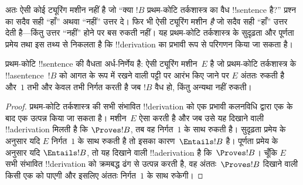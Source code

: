 \documentclass[../../../include/open-logic-section]{subfiles}
\begin{document}
\begin{explain}
अतः ऐसी कोई ट्यूरिंग मशीन नहीं है जो ``क्या $!B$ प्रथम-कोटि तर्कशास्त्र
का वैध !!{sentence} है?'' प्रश्न का सदैव सही ``हाँ'' अथवा ``नहीं'' उत्तर
दे। फिर भी ऐसी ट्यूरिंग मशीन \emph{है} जो सदैव सही ``हाँ'' उत्तर देती
है---किंतु उत्तर ``नहीं'' होने पर बस रुकती नहीं। यह प्रथम-कोटि
तर्कशास्त्र के सुदृढ़ता और पूर्णता प्रमेय तथा इस तथ्य से निकलता है कि
!!{derivation} का प्रभावी रूप से परिगणन किया जा सकता है।
\end{explain}

\begin{thm}
  प्रथम-कोटि !!{sentence} की वैधता अर्ध-निर्णेय है: ऐसी ट्यूरिंग
  मशीन~$E$ है जो प्रथम-कोटि तर्कशास्त्र के !!a{sentence}~$!B$ को आगत के
  रूप में रखने वाली पट्टी पर आरंभ किए जाने पर $E$ अंततः रुकती है और~$1$
  तभी और केवल तभी निर्गत करती है जब $!B$ वैध हो, किंतु अन्यथा नहीं रुकती।
\end{thm}

\begin{proof}
  प्रथम-कोटि तर्कशास्त्र की सभी संभावित !!{derivation} को एक प्रभावी
  कलनविधि द्वारा एक के बाद एक उत्पन्न किया जा सकता है। मशीन~$E$ ऐसा
  करती है और जब उसे यह दिखाने वाली !!a{derivation} मिलती है कि $\Proves
  !B$, तब वह निर्गत~$1$ के साथ रुकती है। सुदृढ़ता प्रमेय के अनुसार यदि
  $E$ निर्गत~$1$ के साथ रुकती है तो इसका कारण~$\Entails !B$ है। पूर्णता
  प्रमेय के अनुसार यदि $\Entails !B$, तो यह दिखाने वाली !!a{derivation}
  है कि~$\Proves !B$। चूँकि $E$ सभी संभावित !!{derivation} को क्रमबद्ध
  ढंग से उत्पन्न करती है, वह अंततः~$\Proves !B$ दिखाने वाली किसी एक को
  पाएगी और इसलिए अंततः निर्गत~$1$ के साथ रुकेगी।
\end{proof}
\end{document}
